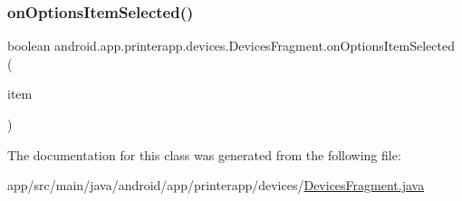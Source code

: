 \subsubsection{\texorpdfstring{on\+Options\+Item\+Selected()}{onOptionsItemSelected()}}
{\footnotesize\ttfamily boolean android.\+app.\+printerapp.\+devices.\+Devices\+Fragment.\+on\+Options\+Item\+Selected (\begin{DoxyParamCaption}\item[{android.\+view.\+Menu\+Item}]{item }\end{DoxyParamCaption})}



The documentation for this class was generated from the following file\+:\begin{DoxyCompactItemize}
\item 
app/src/main/java/android/app/printerapp/devices/\hyperlink{_devices_fragment_8java}{Devices\+Fragment.\+java}\end{DoxyCompactItemize}
